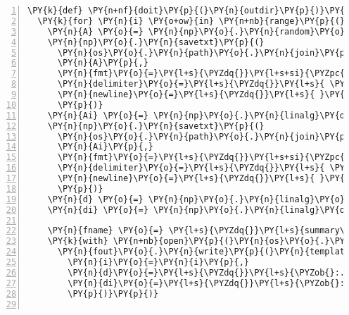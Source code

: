 \begin{Verbatim}[commandchars=\\\{\},numbers=left,numbersep=0.5em]
\PY{k}{def} \PY{n+nf}{doit}\PY{p}{(}\PY{n}{outdir}\PY{p}{)}\PY{p}{:}
  \PY{k}{for} \PY{n}{i} \PY{o+ow}{in} \PY{n+nb}{range}\PY{p}{(}\PY{l+m+mi}{5}\PY{p}{)}\PY{p}{:}
    \PY{n}{A} \PY{o}{=} \PY{n}{np}\PY{o}{.}\PY{n}{random}\PY{o}{.}\PY{n}{randn}\PY{p}{(}\PY{l+m+mi}{4}\PY{p}{,}\PY{l+m+mi}{4}\PY{p}{)}
    \PY{n}{np}\PY{o}{.}\PY{n}{savetxt}\PY{p}{(}
      \PY{n}{os}\PY{o}{.}\PY{n}{path}\PY{o}{.}\PY{n}{join}\PY{p}{(}\PY{n}{outdir}\PY{p}{,} \PY{l+s}{\PYZdq{}}\PY{l+s}{\PYZob{}\PYZcb{}.tex}\PY{l+s}{\PYZdq{}}\PY{o}{.}\PY{n}{format}\PY{p}{(}\PY{n}{i}\PY{p}{)}\PY{p}{)}\PY{p}{,}
      \PY{n}{A}\PY{p}{,}
      \PY{n}{fmt}\PY{o}{=}\PY{l+s}{\PYZdq{}}\PY{l+s+si}{\PYZpc{}5.3f}\PY{l+s}{\PYZdq{}}\PY{p}{,}
      \PY{n}{delimiter}\PY{o}{=}\PY{l+s}{\PYZdq{}}\PY{l+s}{ \PYZam{} }\PY{l+s}{\PYZdq{}}\PY{p}{,}
      \PY{n}{newline}\PY{o}{=}\PY{l+s}{\PYZdq{}}\PY{l+s}{ }\PY{l+s+se}{\PYZbs{}\PYZbs{}}\PY{l+s+se}{\PYZbs{}\PYZbs{}}\PY{l+s+se}{\PYZbs{}n}\PY{l+s}{\PYZdq{}}\PY{p}{,}
      \PY{p}{)}
    \PY{n}{Ai} \PY{o}{=} \PY{n}{np}\PY{o}{.}\PY{n}{linalg}\PY{o}{.}\PY{n}{inv}\PY{p}{(}\PY{n}{A}\PY{p}{)}
    \PY{n}{np}\PY{o}{.}\PY{n}{savetxt}\PY{p}{(}
      \PY{n}{os}\PY{o}{.}\PY{n}{path}\PY{o}{.}\PY{n}{join}\PY{p}{(}\PY{n}{outdir}\PY{p}{,} \PY{l+s}{\PYZdq{}}\PY{l+s}{\PYZob{}\PYZcb{}i.tex}\PY{l+s}{\PYZdq{}}\PY{o}{.}\PY{n}{format}\PY{p}{(}\PY{n}{i}\PY{p}{)}\PY{p}{)}\PY{p}{,}
      \PY{n}{Ai}\PY{p}{,}
      \PY{n}{fmt}\PY{o}{=}\PY{l+s}{\PYZdq{}}\PY{l+s+si}{\PYZpc{}5.3f}\PY{l+s}{\PYZdq{}}\PY{p}{,}
      \PY{n}{delimiter}\PY{o}{=}\PY{l+s}{\PYZdq{}}\PY{l+s}{ \PYZam{} }\PY{l+s}{\PYZdq{}}\PY{p}{,}
      \PY{n}{newline}\PY{o}{=}\PY{l+s}{\PYZdq{}}\PY{l+s}{ }\PY{l+s+se}{\PYZbs{}\PYZbs{}}\PY{l+s+se}{\PYZbs{}\PYZbs{}}\PY{l+s+se}{\PYZbs{}n}\PY{l+s}{\PYZdq{}}\PY{p}{,}
      \PY{p}{)}
    \PY{n}{d} \PY{o}{=} \PY{n}{np}\PY{o}{.}\PY{n}{linalg}\PY{o}{.}\PY{n}{det}\PY{p}{(}\PY{n}{A}\PY{p}{)}
    \PY{n}{di} \PY{o}{=} \PY{n}{np}\PY{o}{.}\PY{n}{linalg}\PY{o}{.}\PY{n}{det}\PY{p}{(}\PY{n}{Ai}\PY{p}{)}
    
    \PY{n}{fname} \PY{o}{=} \PY{l+s}{\PYZdq{}}\PY{l+s}{summary\PYZob{}\PYZcb{}.tex}\PY{l+s}{\PYZdq{}}\PY{o}{.}\PY{n}{format}\PY{p}{(}\PY{n}{i}\PY{p}{)}
    \PY{k}{with} \PY{n+nb}{open}\PY{p}{(}\PY{n}{os}\PY{o}{.}\PY{n}{path}\PY{o}{.}\PY{n}{join}\PY{p}{(}\PY{n}{outdir}\PY{p}{,}\PY{n}{fname}\PY{p}{)}\PY{p}{,}\PY{l+s}{\PYZdq{}}\PY{l+s}{w}\PY{l+s}{\PYZdq{}}\PY{p}{)} \PY{k}{as} \PY{n}{fout}\PY{p}{:}
      \PY{n}{fout}\PY{o}{.}\PY{n}{write}\PY{p}{(}\PY{n}{template}\PY{p}{(}\PY{n}{tex}\PY{p}{)}\PY{o}{.}\PY{n}{format}\PY{p}{(}
        \PY{n}{i}\PY{o}{=}\PY{n}{i}\PY{p}{,}
        \PY{n}{d}\PY{o}{=}\PY{l+s}{\PYZdq{}}\PY{l+s}{\PYZob{}:.3f\PYZcb{}}\PY{l+s}{\PYZdq{}}\PY{o}{.}\PY{n}{format}\PY{p}{(}\PY{n}{d}\PY{p}{)}\PY{p}{,}
        \PY{n}{di}\PY{o}{=}\PY{l+s}{\PYZdq{}}\PY{l+s}{\PYZob{}:.3f\PYZcb{}}\PY{l+s}{\PYZdq{}}\PY{o}{.}\PY{n}{format}\PY{p}{(}\PY{n}{di}\PY{p}{)}\PY{p}{,}
        \PY{p}{)}\PY{p}{)}


\end{Verbatim}
